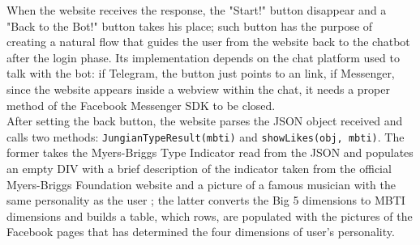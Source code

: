 \documentclass[b5paper,10pt,twoside,cucitura]{toptesi}
\begin{document}
When the website receives the response, the "Start!" button disappear and a "Back to the Bot!" button takes his place; such button has the purpose of creating a natural flow that guides the user from the website back to the chatbot after the login phase. Its implementation depends on the chat platform used to talk with the bot: if Telegram, the button just points to an  link, if Messenger, since the website appears inside a webview within the chat, it needs a proper method of the Facebook Messenger SDK to be closed.
\\
After setting the back button, the website parses the JSON object received and calls two methods: \texttt{JungianTypeResult(mbti)} and \texttt{showLikes(obj, mbti)}. The former takes the Myers-Briggs Type Indicator read from the JSON and populates an empty DIV with a brief description of the indicator taken from the official Myers-Briggs Foundation website   \citep{MBfoundation} and a picture of a famous musician with the same personality as the user   \citep{Intuitivemusician}; the latter converts the Big 5 dimensions to MBTI dimensions and builds a table, which rows, are populated with the pictures of the Facebook pages that has determined the four dimensions of user's personality.
\end{document}
